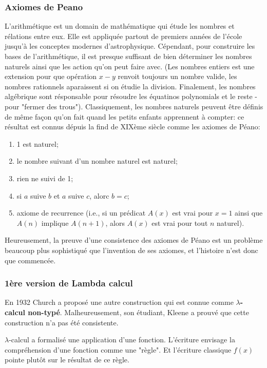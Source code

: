 \documentclass[12pt, a4paper]{article}
\begin{document}
\subsubsection*{Axiomes de Peano}
L'arithmétique est un domain de mathématique qui étude les nombres et rélations entre eux.
Elle est appliquée partout de premiers années de l'école jusqu'à les conceptes modernes d'astrophysique.
Cépendant, pour construire les bases de l'arithmétique, il est presque suffisant de bien déterminer les nombres naturels ainsi que les action qu'on peut faire avec.
(Les nombres entiers est une extension pour que opération $x - y$ renvoit toujours un nombre valide, les nombres rationnels aparaissent si on étudie la division. Finalement, les nombres algébrique sont résponsable pour résoudre les équatinos polynomials et le reste - pour "fermer des trous").
Classiquement, les nombres naturels peuvent être définis de même façon qu'on fait quand les petits enfants apprennent à compter: ce résultat est connus dépuis la find de XIXème siècle comme les axiomes de Péano:
\begin{enumerate}
	\item 1 est naturel;
	\item le nombre suivant d'un nombre naturel est naturel;
	\item rien ne suivi de 1;
	\item si $a$ suive $b$ et $a$ suive $c$, alorc $b=c$;
	\item axiome de recurrence (i.e., si un prédicat $A(x)$ est vrai pour $x=1$ ainsi que $A(n)$ implique $A(n+1)$, alors $A(x)$ est vrai pour tout $n$ naturel).
\end{enumerate}
Heureusement, la preuve d'une consistence des axiomes de Péano est un problème beaucoup plus sophistiqué que l'invention de ses axiomes, et l'histoire n'est donc que commencée.

\subsubsection*{1ère version de Lambda calcul}
En 1932 Church a proposé une autre construction qui est connue comme \textbf{$\lambda$-calcul non-typé}.
Malheureusement, son étudiant, Kleene a prouvé que cette construction n'a pas été consistente.

$\lambda$-calcul a formalisé une application d'une fonction. L'écriture envisage la compréhension d'une fonction comme une "règle". Et l'écriture classique $f(x)$ pointe plutôt sur le résultat de ce règle.
\end{document}
